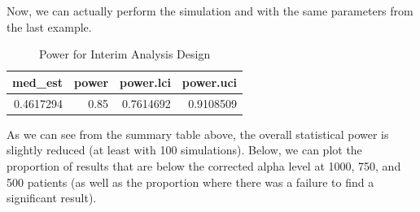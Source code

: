 \documentclass[
]{book}
\newenvironment{Shaded}{\begin{snugshade}}{\end{snugshade}}
\newcommand{\AttributeTok}[1]{\textcolor[rgb]{0.77,0.63,0.00}{#1}}
\newcommand{\DecValTok}[1]{\textcolor[rgb]{0.00,0.00,0.81}{#1}}
\newcommand{\FunctionTok}[1]{\textcolor[rgb]{0.00,0.00,0.00}{#1}}
\newcommand{\NormalTok}[1]{#1}
\newcommand{\OtherTok}[1]{\textcolor[rgb]{0.56,0.35,0.01}{#1}}
\newcommand{\SpecialCharTok}[1]{\textcolor[rgb]{0.00,0.00,0.00}{#1}}
\newcommand{\StringTok}[1]{\textcolor[rgb]{0.31,0.60,0.02}{#1}}
\begin{document}
Now, we can actually perform the simulation and with the same parameters from the last example.

\begin{Shaded}
\end{Shaded}

\begin{table}

\caption{\label{tab:unnamed-chunk-324}Power for Interim Analysis Design}
\centering
\begin{tabular}[t]{r|r|r|r}
\hline
med\_est & power & power.lci & power.uci\\
\hline
0.4617294 & 0.85 & 0.7614692 & 0.9108509\\
\hline
\end{tabular}
\end{table}

As we can see from the summary table above, the overall statistical power is slightly reduced (at least with 100 simulations). Below, we can plot the proportion of results that are below the corrected alpha level at 1000, 750, and 500 patients (as well as the proportion where there was a failure to find a significant result).

\begin{Shaded}
\end{Shaded}
\end{document}
